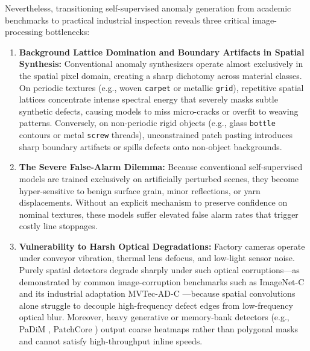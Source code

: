 Nevertheless, transitioning self-supervised anomaly generation from academic benchmarks to practical industrial inspection reveals three critical image-processing bottlenecks:
\begin{enumerate}
    \item \textbf{Background Lattice Domination and Boundary Artifacts in Spatial Synthesis:} Conventional anomaly synthesizers operate almost exclusively in the spatial pixel domain, creating a sharp dichotomy across material classes. On periodic textures (e.g., woven \texttt{carpet} or metallic \texttt{grid}), repetitive spatial lattices concentrate intense spectral energy that severely masks subtle synthetic defects, causing models to miss micro-cracks or overfit to weaving patterns. Conversely, on non-periodic rigid objects (e.g., glass \texttt{bottle} contours or metal \texttt{screw} threads), unconstrained patch pasting introduces sharp boundary artifacts or spills defects onto non-object backgrounds.
    \item \textbf{The Severe False-Alarm Dilemma:} Because conventional self-supervised models are trained exclusively on artificially perturbed scenes, they become hyper-sensitive to benign surface grain, minor reflections, or yarn displacements. Without an explicit mechanism to preserve confidence on nominal textures, these models suffer elevated false alarm rates that trigger costly line stoppages.
    \item \textbf{Vulnerability to Harsh Optical Degradations:} Factory cameras operate under conveyor vibration, thermal lens defocus, and low-light sensor noise. Purely spatial detectors degrade sharply under such optical corruptions---as demonstrated by common image-corruption benchmarks such as ImageNet-C \cite{hendrycks2019robustness} and its industrial adaptation MVTec-AD-C \cite{chen2023mvtecadc}---because spatial convolutions alone struggle to decouple high-frequency defect edges from low-frequency optical blur. Moreover, heavy generative or memory-bank detectors (e.g., PaDiM \cite{defard2021padim}, PatchCore \cite{roth2022towards}) output coarse heatmaps rather than polygonal masks and cannot satisfy high-throughput inline speeds.
\end{enumerate}

